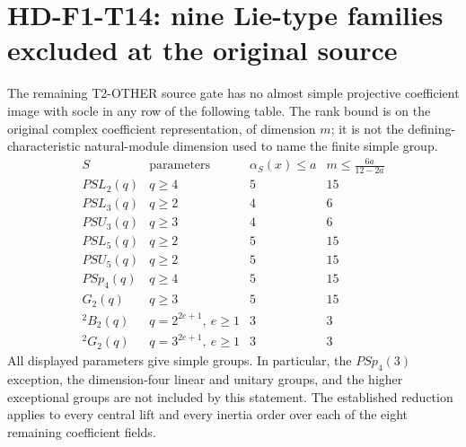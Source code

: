 \section[HD-F1-T14: nine Lie-type source exclusions]{HD-F1-T14: nine Lie-type families excluded at the original source}
\label{sec:f1-low-lie-rank-source-exclusion}

The remaining T2-OTHER source gate has no almost simple
projective coefficient image with socle in any row of the
following table. The rank bound is on the original complex
coefficient representation, of dimension \(m\); it is not
the defining-characteristic natural-module dimension used
to name the finite simple group.
\[
\begin{array}{c|c|c|c}
 S&\text{parameters}&\alpha_S(x)\le a&m\le\frac{6a}{12-2a}\\ \hline
 PSL_2(q)&q\ge4&5&15\\
 PSL_3(q)&q\ge2&4&6\\
 PSU_3(q)&q\ge3&4&6\\
 PSL_5(q)&q\ge2&5&15\\
 PSU_5(q)&q\ge2&5&15\\
 PSp_4(q)&q\ge4&5&15\\
 G_2(q)&q\ge3&5&15\\
 {}^2B_2(q)&q=2^{2e+1},\ e\ge1&3&3\\
 {}^2G_2(q)&q=3^{2e+1},\ e\ge1&3&3
\end{array}
 \tag{F1T14.1}
\]
All displayed parameters give simple groups. In particular,
the \(PSp_4(3)\) exception, the dimension-four linear and
unitary groups, and the higher exceptional groups are not
included by this statement. The established reduction
applies to every central lift and every inertia order over
each of the eight remaining coefficient fields.

